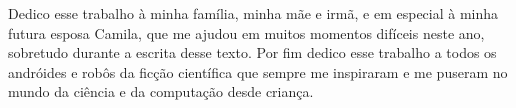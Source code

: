 %



\begin{dedicatoria}
Dedico esse trabalho à minha família, minha mãe e irmã, e em especial à minha futura esposa Camila, que me ajudou em muitos momentos difíceis neste ano, sobretudo durante a escrita desse texto. Por fim dedico esse trabalho a todos os andróides e robôs da ficção científica que sempre me inspiraram e me puseram no mundo da ciência e da computação desde criança.
\end{dedicatoria}

\hypersetup{pageanchor=true}





